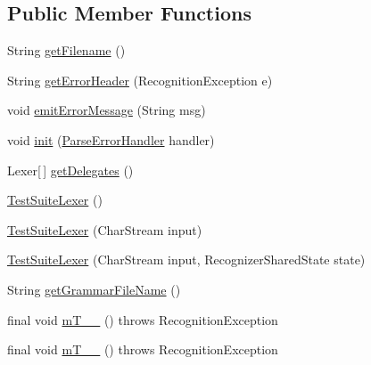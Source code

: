 \subsection*{Public Member Functions}
\begin{DoxyCompactItemize}
\item 
String \hyperlink{classorg_1_1tzi_1_1use_1_1parser_1_1testsuite_1_1_test_suite_lexer_a3689d84f1205c49f81da31bf153c7ac9}{get\-Filename} ()
\item 
String \hyperlink{classorg_1_1tzi_1_1use_1_1parser_1_1testsuite_1_1_test_suite_lexer_a3c658447b55bd7789f93ea1849ceef51}{get\-Error\-Header} (Recognition\-Exception e)
\item 
void \hyperlink{classorg_1_1tzi_1_1use_1_1parser_1_1testsuite_1_1_test_suite_lexer_a87c5616c16df94e6781636f9645f6745}{emit\-Error\-Message} (String msg)
\item 
void \hyperlink{classorg_1_1tzi_1_1use_1_1parser_1_1testsuite_1_1_test_suite_lexer_aba6d728719d3f5f61d75ac9655be7404}{init} (\hyperlink{classorg_1_1tzi_1_1use_1_1parser_1_1_parse_error_handler}{Parse\-Error\-Handler} handler)
\item 
Lexer\mbox{[}$\,$\mbox{]} \hyperlink{classorg_1_1tzi_1_1use_1_1parser_1_1testsuite_1_1_test_suite_lexer_a8d771b5351c997c707d6805727044d2c}{get\-Delegates} ()
\item 
\hyperlink{classorg_1_1tzi_1_1use_1_1parser_1_1testsuite_1_1_test_suite_lexer_abb5530b85aae679fbbeacd29426aff87}{Test\-Suite\-Lexer} ()
\item 
\hyperlink{classorg_1_1tzi_1_1use_1_1parser_1_1testsuite_1_1_test_suite_lexer_acb0a8d903adc693e68b2f3762c3f581f}{Test\-Suite\-Lexer} (Char\-Stream input)
\item 
\hyperlink{classorg_1_1tzi_1_1use_1_1parser_1_1testsuite_1_1_test_suite_lexer_a6b062be7b4bacdefdfdadaa05f68fcb0}{Test\-Suite\-Lexer} (Char\-Stream input, Recognizer\-Shared\-State state)
\item 
String \hyperlink{classorg_1_1tzi_1_1use_1_1parser_1_1testsuite_1_1_test_suite_lexer_a2ca05935889765c330b9116d5f5623e4}{get\-Grammar\-File\-Name} ()
\item 
final void \hyperlink{classorg_1_1tzi_1_1use_1_1parser_1_1testsuite_1_1_test_suite_lexer_a1c927b5b05b66d79712f8c2df91536b3}{m\-T\-\_\-\-\_} ()  throws Recognition\-Exception 
\item 
final void \hyperlink{classorg_1_1tzi_1_1use_1_1parser_1_1testsuite_1_1_test_suite_lexer_a376d82346bcc238857658f08a0b4e886}{m\-T\-\_\-\-\_} ()  throws Recognition\-Exception 

\end{DoxyCompactItemize}
